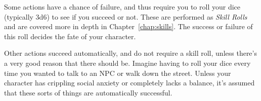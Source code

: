 Some actions have a chance of failure, and thus require you to roll your dice (typically 3d6) to see if you succeed or not. 
These are performed as \textit{Skill Rolls} and are covered more in depth in Chapter~\ref{chap:skills}. 
The success or failure of this roll decides the fate of your character.

Other actions succeed automatically, and do not require a skill roll, unless there's a very good reason that there should be.
Imagine having to roll your dice every time you wanted to talk to an NPC or walk down the street. 
Unless your character has crippling social anxiety or completely lacks a balance, it's assumed that these sorts of things are automatically successful.
